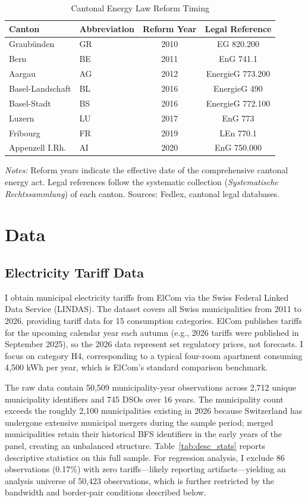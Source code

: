\documentclass[12pt]{article}
\begin{document}
\begin{table}[H]
\centering
\caption{Cantonal Energy Law Reform Timing}
\label{tab:reform_timing}
\begin{tabular}{llcc}
\toprule
Canton & Abbreviation & Reform Year & Legal Reference \\
\midrule
Graubünden & GR & 2010 & EG 820.200 \\
Bern & BE & 2011 & EnG 741.1 \\
Aargau & AG & 2012 & EnergieG 773.200 \\
Basel-Landschaft & BL & 2016 & EnergieG 490 \\
Basel-Stadt & BS & 2016 & EnergieG 772.100 \\
Luzern & LU & 2017 & EnG 773 \\
Fribourg & FR & 2019 & LEn 770.1 \\
Appenzell I.Rh. & AI & 2020 & EnG 750.000 \\
\bottomrule
\end{tabular}
\begin{tablenotes}[flushleft]
\small
\item \textit{Notes:} Reform years indicate the effective date of the comprehensive cantonal energy act. Legal references follow the systematic collection (\textit{Systematische Rechtssammlung}) of each canton. Sources: Fedlex, cantonal legal databases.
\end{tablenotes}
\end{table}


\section{Data}

\subsection{Electricity Tariff Data}

I obtain municipal electricity tariffs from ElCom via the Swiss Federal Linked Data Service (LINDAS). The dataset covers all Swiss municipalities from 2011 to 2026, providing tariff data for 15 consumption categories. ElCom publishes tariffs for the upcoming calendar year each autumn (e.g., 2026 tariffs were published in September 2025), so the 2026 data represent set regulatory prices, not forecasts. I focus on category H4, corresponding to a typical four-room apartment consuming 4,500 kWh per year, which is ElCom's standard comparison benchmark.

The raw data contain 50,509 municipality-year observations across 2,712 unique municipality identifiers and 745 DSOs over 16 years. The municipality count exceeds the roughly 2,100 municipalities existing in 2026 because Switzerland has undergone extensive municipal mergers during the sample period; merged municipalities retain their historical BFS identifiers in the early years of the panel, creating an unbalanced structure. Table~\ref{tab:desc_stats} reports descriptive statistics on this full sample. For regression analysis, I exclude 86 observations (0.17\%) with zero tariffs---likely reporting artifacts---yielding an analysis universe of 50,423 observations, which is further restricted by the bandwidth and border-pair conditions described below.
\end{document}
